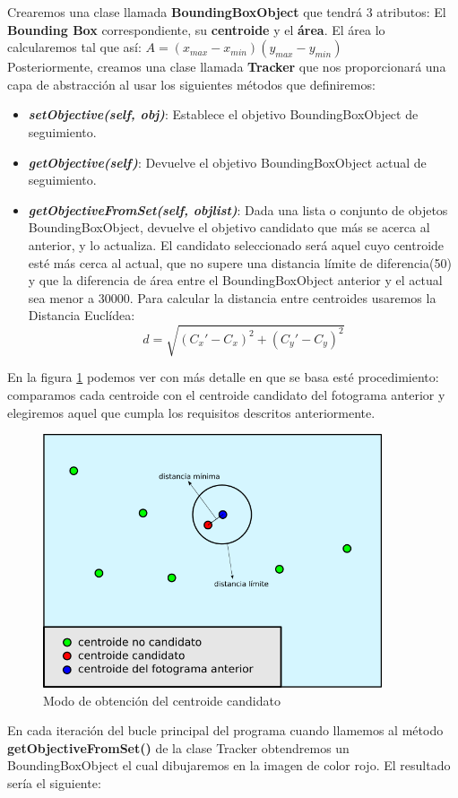 Crearemos una clase llamada \textbf{BoundingBoxObject} que tendrá 3 atributos: El \textbf{Bounding Box} correspondiente, su \textbf{centroide} y el \textbf{área}. El área lo calcularemos tal que así: $A = (x_{max} - x_{min}) (y_{max} - y_{min})$\\

Posteriormente, creamos una clase llamada \textbf{Tracker} que nos proporcionará una capa de abstracción al usar los siguientes métodos que definiremos:
\begin{itemize}
	\item \textbf{\textit{setObjective(self, obj)}}: Establece el objetivo BoundingBoxObject de seguimiento.
	\item \textbf{\textit{getObjective(self)}}: Devuelve el objetivo BoundingBoxObject actual de seguimiento.
	\item \textbf{\textit{getObjectiveFromSet(self, objlist)}}: Dada una lista o conjunto de objetos BoundingBoxObject, devuelve el objetivo candidato que más se acerca al anterior, y lo actualiza. El candidato seleccionado será aquel cuyo centroide esté más cerca al actual, que no supere una distancia límite de diferencia(50) y que la diferencia de área entre el BoundingBoxObject anterior y el actual sea menor a 30000. Para calcular la distancia entre centroides usaremos la Distancia Euclídea:
	\begin{equation*}
	d = \sqrt{(C_{x}' - C_{x})^2 + (C_{y}' - C_{y})^2}
	\end{equation*}
\end{itemize}

En la figura \ref{fig:obtencion_centroide} podemos ver con más detalle en que se basa esté procedimiento: comparamos cada centroide con el centroide candidato del fotograma anterior y elegiremos aquel que cumpla los requisitos descritos anteriormente.
\begin{figure} [H]
  \begin{center}
    \includegraphics[width=10cm]{imagenes/esquema-tracker.png}
  \end{center}
  \caption[Modo de obtención del centroide candidato]{Modo de obtención del centroide candidato}
  \label{fig:obtencion_centroide}
\end{figure}

En cada iteración del bucle principal del programa cuando llamemos al método \textbf{getObjectiveFromSet()} de la clase Tracker obtendremos un BoundingBoxObject el cual dibujaremos en la imagen de color rojo. El resultado sería el siguiente:


 

